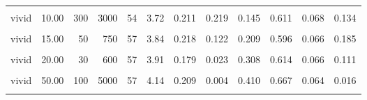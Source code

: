 \documentclass[
]{article}
\begin{document}
\begin{longtable}[t]{lrrrrrrlrrrl}
\hspace{1em}\cellcolor{gray!10}{vivid} & \cellcolor{gray!10}{10.00} & \cellcolor{gray!10}{40} & \cellcolor{gray!10}{400} & \cellcolor{gray!10}{57} & \cellcolor{gray!10}{3.86} & \cellcolor{gray!10}{0.195} & \cellcolor{gray!10}{0.061} & \cellcolor{gray!10}{0.247} & \cellcolor{gray!10}{0.649} & \cellcolor{gray!10}{0.064} & \cellcolor{gray!10}{0.033}\\
\hspace{1em}vivid & 10.00 & 300 & 3000 & 54 & 3.72 & 0.211 & 0.219 & 0.145 & 0.611 & 0.068 & 0.134\\
\hspace{1em}\cellcolor{gray!10}{vivid} & \cellcolor{gray!10}{15.00} & \cellcolor{gray!10}{20} & \cellcolor{gray!10}{300} & \cellcolor{gray!10}{54} & \cellcolor{gray!10}{3.39} & \cellcolor{gray!10}{0.212} & \cellcolor{gray!10}{0.678} & \cellcolor{gray!10}{-0.072} & \cellcolor{gray!10}{0.556} & \cellcolor{gray!10}{0.069} & \cellcolor{gray!10}{0.497}\\
\hspace{1em}vivid & 15.00 & 50 & 750 & 57 & 3.84 & 0.218 & 0.122 & 0.209 & 0.596 & 0.066 & 0.185\\
\hspace{1em}\cellcolor{gray!10}{vivid} & \cellcolor{gray!10}{20.00} & \cellcolor{gray!10}{10} & \cellcolor{gray!10}{200} & \cellcolor{gray!10}{54} & \cellcolor{gray!10}{3.69} & \cellcolor{gray!10}{0.211} & \cellcolor{gray!10}{0.349} & \cellcolor{gray!10}{0.120} & \cellcolor{gray!10}{0.648} & \cellcolor{gray!10}{0.066} & \cellcolor{gray!10}{0.040}\\
\hspace{1em}vivid & 20.00 & 30 & 600 & 57 & 3.91 & 0.179 & 0.023 & 0.308 & 0.614 & 0.066 & 0.111\\
\hspace{1em}\cellcolor{gray!10}{vivid} & \cellcolor{gray!10}{50.00} & \cellcolor{gray!10}{10} & \cellcolor{gray!10}{500} & \cellcolor{gray!10}{54} & \cellcolor{gray!10}{3.94} & \cellcolor{gray!10}{0.217} & \cellcolor{gray!10}{0.035} & \cellcolor{gray!10}{0.281} & \cellcolor{gray!10}{0.704} & \cellcolor{gray!10}{0.063} & \cellcolor{gray!10}{0.004}\\
\hspace{1em}vivid & 50.00 & 100 & 5000 & 57 & 4.14 & 0.209 & 0.004 & 0.410 & 0.667 & 0.064 & 0.016\\
\hspace{1em}\cellcolor{gray!10}{vivid} & \cellcolor{gray!10}{100.00} & \cellcolor{gray!10}{30} & \cellcolor{gray!10}{3000} & \cellcolor{gray!10}{54} & \cellcolor{gray!10}{3.78} & \cellcolor{gray!10}{0.210} & \cellcolor{gray!10}{0.172} & \cellcolor{gray!10}{0.182} & \cellcolor{gray!10}{0.667} & \cellcolor{gray!10}{0.065} & \cellcolor{gray!10}{0.020}\\

\end{longtable}
\end{document}

